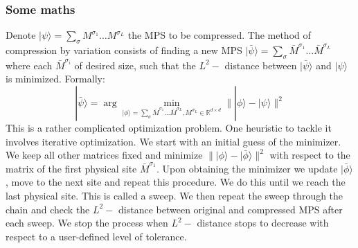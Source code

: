 \documentclass[english]{article}
\begin{document}
\subsubsection{Some maths}
Denote $|\psi\rangle=\sum_{\sigma}M^{\sigma_1}\dots M^{\sigma_L}$ the MPS to be compressed. The method of compression by variation consists of finding a new MPS $|\bar\psi\rangle=\sum_{\sigma}\bar M^{\sigma_1}\dots 
 \bar M^{\sigma_L}$ where each $\bar M^{\sigma_i}$ of desired size, such that the $L^2-$ distance between $|\bar\psi\rangle$ and $|\psi\rangle$ is minimized. Formally:
 \[
|\bar\psi\rangle = \arg\min_{|\phi\rangle=\sum_{\sigma}\bar M^{\sigma_1}\dots 
 \bar M^{\sigma_L}, M^{\sigma_L} \in \mathbb{R}^{d\times d} }\||\phi \rangle-|\psi\rangle\|^2
 \]
 This is a rather complicated optimization problem. One heuristic to tackle it involves iterative optimization. We start with an initial guess of the minimizer. We keep all other matrices fixed and minimize $\||\phi \rangle-|\bar\phi\rangle\|^2$ with respect to the matrix of the first physical site $\bar M^{\sigma_1}$. Upon obtaining the minimizer we update $|\bar\phi\rangle$, move to the next site and repeat this procedure. We do this until we reach the last physical site. This is called a sweep. We then repeat the sweep through the chain and check the $L^2-$ distance between original and compressed MPS after each sweep. We stop the process when $L^2-$ distance stops to decrease with respect to a user-defined level of tolerance.
\end{document}
